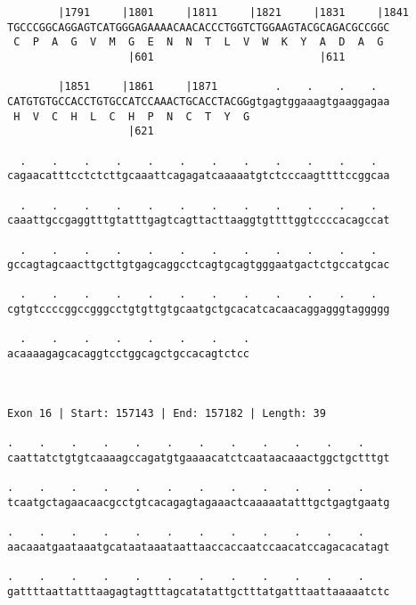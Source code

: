 \documentclass{article}
\begin{document}
\begin{Verbatim}
        |1791     |1801     |1811     |1821     |1831     |1841
TGCCCGGCAGGAGTCATGGGAGAAAACAACACCCTGGTCTGGAAGTACGCAGACGCCGGC
 C  P  A  G  V  M  G  E  N  N  T  L  V  W  K  Y  A  D  A  G 
                   |601                          |611       
  
        |1851     |1861     |1871         .    .    .    .  
CATGTGTGCCACCTGTGCCATCCAAACTGCACCTACGGgtgagtggaaagtgaaggagaa
 H  V  C  H  L  C  H  P  N  C  T  Y  G                      
                   |621                                     
  
  .    .    .    .    .    .    .    .    .    .    .    .  
cagaacatttcctctcttgcaaattcagagatcaaaaatgtctcccaagttttccggcaa
                                                            
  .    .    .    .    .    .    .    .    .    .    .    .  
caaattgccgaggtttgtatttgagtcagttacttaaggtgttttggtccccacagccat
                                                            
  .    .    .    .    .    .    .    .    .    .    .    .  
gccagtagcaacttgcttgtgagcaggcctcagtgcagtgggaatgactctgccatgcac
                                                            
  .    .    .    .    .    .    .    .    .    .    .    .  
cgtgtccccggccgggcctgtgttgtgcaatgctgcacatcacaacaggagggtaggggg
                                                            
  .    .    .    .    .    .    .    .
acaaaagagcacaggtcctggcagctgccacagtctcc
                                      
                                      
 
Exon 16 | Start: 157143 | End: 157182 | Length: 39
 
.    .    .    .    .    .    .    .    .    .    .    .    
caattatctgtgtcaaaagccagatgtgaaaacatctcaataacaaactggctgctttgt
                                                            
.    .    .    .    .    .    .    .    .    .    .    .    
tcaatgctagaacaacgcctgtcacagagtagaaactcaaaaatatttgctgagtgaatg
                                                            
.    .    .    .    .    .    .    .    .    .    .    .    
aacaaatgaataaatgcataataaataattaaccaccaatccaacatccagacacatagt
                                                            
.    .    .    .    .    .    .    .    .    .    .    .    
gattttaattatttaagagtagtttagcatatattgctttatgatttaattaaaaatctc
                                                            

\end{Verbatim}
\end{document}
